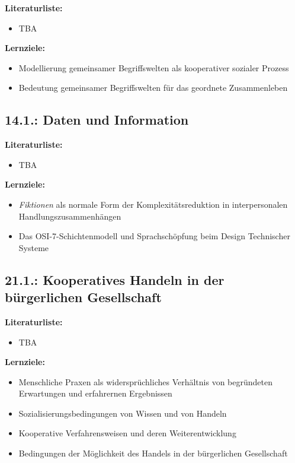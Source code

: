 \documentclass[11pt,a4paper]{article}
\begin{document}
\textbf{Literaturliste:}
\begin{itemize}
\item TBA
\end{itemize}

\textbf{Lernziele:}
\begin{itemize}[noitemsep]
\item Modellierung gemeinsamer Begriffswelten als kooperativer sozialer
  Prozess 
\item Bedeutung gemeinsamer Begriffswelten für das geordnete Zusammenleben 
\end{itemize}

\subsection{14.1.: Daten und Information}

\textbf{Literaturliste:}
\begin{itemize}
\item TBA
\end{itemize}

\textbf{Lernziele:}
\begin{itemize}[noitemsep]
\item \emph{Fiktionen} als normale Form der Komplexitätsreduktion in
  interpersonalen Handlungszusammenhängen
\item Das OSI-7-Schichtenmodell und Sprachschöpfung beim Design Technischer
  Systeme  
\end{itemize}

\subsection{21.1.: Kooperatives Handeln in der bürgerlichen Gesellschaft}

\textbf{Literaturliste:}
\begin{itemize}
\item TBA
\end{itemize}

\textbf{Lernziele:}
\begin{itemize}[noitemsep]
\item Menschliche Praxen als widersprüchliches Verhältnis von begründeten
  Erwartungen und erfahrernen Ergebnissen
\item Sozialisierungsbedingungen von Wissen und von Handeln
\item Kooperative Verfahrensweisen und deren Weiterentwicklung
\item Bedingungen der Möglichkeit des Handels in der bürgerlichen Gesellschaft 
\end{itemize}
\end{document}
